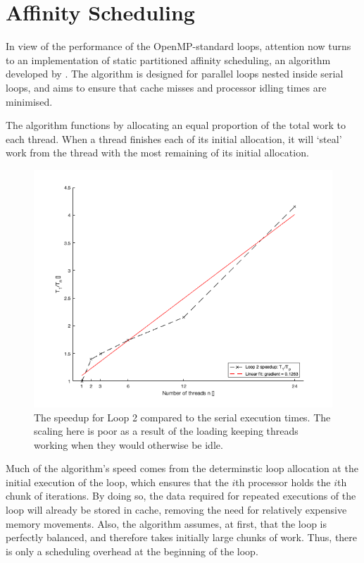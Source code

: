 \documentclass{article} %
\begin{document}
\section*{Affinity Scheduling}

In view of the performance of the OpenMP-standard loops, attention now turns to an implementation of static partitioned affinity scheduling, an algorithm developed by \citet{273046}.
The algorithm is designed for parallel loops nested inside serial loops, and aims to ensure that cache misses and processor idling times are minimised.

The algorithm functions by allocating an equal proportion of the total work to each thread. 
When a thread finishes each of its initial allocation, it will `steal' work from the thread with the most remaining of its initial allocation.

\begin{figure}
    \centering
    \includegraphics[height=.35\textheight]{part1_plots/loop2_speedup.png}
    \caption{The speedup for Loop 2 compared to the serial execution times. The scaling here is poor as a result of the loading keeping threads working when they would otherwise be idle.}
    \label{fig:loop2speedup}
\end{figure}

Much of the algorithm's speed comes from the determinstic loop allocation at the initial execution of the loop, which ensures that the $i$th processor holds the $i$th chunk of iterations.
By doing so, the data required for repeated executions of the loop will already be stored in cache, removing the need for relatively expensive memory movements.
Also, the algorithm assumes, at first, that the loop is perfectly balanced, and therefore takes initially large chunks of work.
Thus, there is only a scheduling overhead at the beginning of the loop.
\end{document}
